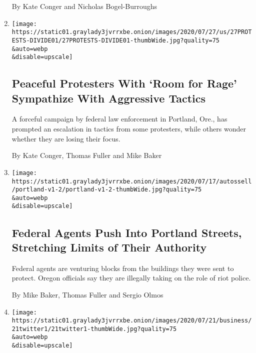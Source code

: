 \begin{enumerate}
  By Kate Conger and Nicholas Bogel-Burroughs
\item
  \href{/2020/07/27/us/protests-divisions-blm.html}{}

  \texttt{[image: https://static01.graylady3jvrrxbe.onion/images/2020/07/27/us/27PROTESTS-DIVIDE01/27PROTESTS-DIVIDE01-thumbWide.jpg?quality=75\\\&auto=webp\\\&disable=upscale]}

  \hypertarget{peaceful-protesters-with-room-for-rage-sympathize-with-aggressive-tactics}{%
  \subsection{Peaceful Protesters With `Room for Rage' Sympathize With
  Aggressive
  Tactics}\label{peaceful-protesters-with-room-for-rage-sympathize-with-aggressive-tactics}}

  A forceful campaign by federal law enforcement in Portland, Ore., has
  prompted an escalation in tactics from some protesters, while others
  wonder whether they are losing their focus.

  By Kate Conger, Thomas Fuller and Mike Baker
\item
  \href{/2020/07/25/us/portland-federal-legal-jurisdiction-courts.html}{}

  \texttt{[image: https://static01.graylady3jvrrxbe.onion/images/2020/07/17/autossell/portland-v1-2/portland-v1-2-thumbWide.jpg?quality=75\\\&auto=webp\\\&disable=upscale]}

  \hypertarget{federal-agents-push-into-portland-streets-stretching-limits-of-their-authority}{%
  \subsection{Federal Agents Push Into Portland Streets, Stretching
  Limits of Their
  Authority}\label{federal-agents-push-into-portland-streets-stretching-limits-of-their-authority}}

  Federal agents are venturing blocks from the buildings they were sent
  to protect. Oregon officials say they are illegally taking on the role
  of riot police.

  By Mike Baker, Thomas Fuller and Sergio Olmos
\item
  \href{/2020/07/21/technology/twitter-bans-qanon-accounts.html}{}

  \texttt{[image: https://static01.graylady3jvrrxbe.onion/images/2020/07/21/business/21twitter1/21twitter1-thumbWide.jpg?quality=75\\\&auto=webp\\\&disable=upscale]}


\end{enumerate}
